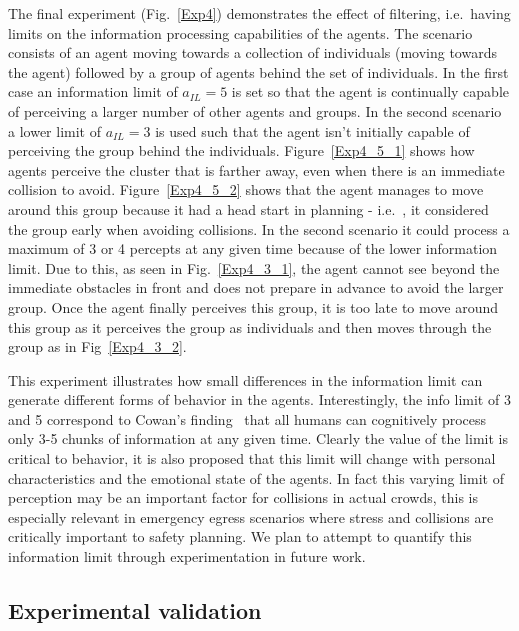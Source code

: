The final experiment (Fig.~\ref{Exp4}) demonstrates the effect of filtering, i.e.\ having limits on the information processing capabilities of the agents. The scenario consists of an agent moving towards a collection of individuals (moving towards the agent) followed by a group of agents behind the set of individuals. In the first case an information limit of $a_{IL} = 5$ is set so that the agent is continually capable of perceiving a larger number of other agents and groups. In the second scenario a lower limit of $a_{IL} = 3$ is used such that the agent isn't initially capable of perceiving the group behind the individuals. Figure~\ref{Exp4_5_1} shows how agents perceive the cluster that is farther away, even when there is an immediate collision to avoid. Figure~\ref{Exp4_5_2} shows that the agent manages to move around this group because it had a head start in planning - i.e.\ , it considered the group early when avoiding collisions. In the second scenario it could process a maximum of 3 or 4 percepts at any given time because of the lower information limit. Due to this, as seen in Fig.~\ref{Exp4_3_1}, the agent cannot see beyond the immediate obstacles in front and does not prepare in advance to avoid the larger group. Once the agent finally perceives this group, it is too late to move around this group as it perceives the group as individuals and then moves through the group as in Fig~\ref{Exp4_3_2}.

This experiment illustrates how small differences in the information limit can generate different forms of behavior in the agents. Interestingly, the info limit of 3 and 5 correspond to Cowan's finding~\cite{Cowan:2001wi} that all humans can cognitively process only 3-5 chunks of information at any given time. Clearly the value of the limit is critical to behavior, it is also proposed that this limit will change with personal characteristics and the emotional state of the agents. In fact this varying limit of perception may be an important factor for collisions in actual crowds, this is especially relevant in emergency egress scenarios where stress and collisions are critically important to safety planning. We plan to attempt to quantify this information limit through experimentation in future work.

\subsection{Experimental validation} %
\label{sec:experimental_validation}

